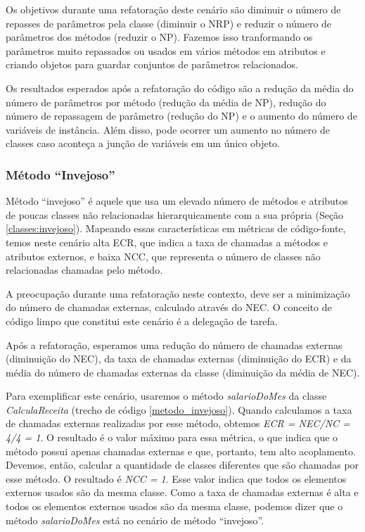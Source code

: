                                      
	
Os objetivos durante uma refatoração deste cenário são diminuir o número de repasses de parâmetros pela classe (diminuir o NRP) e reduzir o número de parâmetros dos métodos (reduzir o NP). Fazemos isso tranformando os parâmetros muito repassados ou usados em vários métodos em atributos e criando objetos para guardar conjuntos de parâmetros relacionados.
	
Os resultados esperados após a refatoração do código são a redução da média do número de parâmetros por método (redução da média de NP), redução do número de repassagem de parâmetro (redução do NP) e o aumento do número de variáveis de instância. Além disso, pode ocorrer um aumento no número de classes caso aconteça a junção de variáveis em um único objeto.	           


\subsubsection{Método ``Invejoso''}
	
Método ``invejoso'' é aquele que usa um elevado número de métodos e atributos de poucas classes não relacionadas hierarquicamente com a sua própria (Seção \ref{classes:invejoso}). Mapeando essas características em métricas de código-fonte, temos neste cenário alta ECR, que indica a taxa de chamadas a métodos e atributos externos, e baixa NCC, que representa o número de classes não relacionadas chamadas pelo método.
	
A preocupação durante uma refatoração neste contexto, deve ser a minimização do número de chamadas externas, calculado através do NEC. O conceito de código limpo que constitui este cenário é a delegação de tarefa.
	
Após a refatoração, esperamos uma redução do número de chamadas externas (diminuição do NEC), da taxa de chamadas externas (diminuição do ECR) e da média do número de chamadas externas da classe (diminuição da média de NEC).
                      
Para exemplificar este cenário, usaremos o método \textit{salarioDoMes} da classe \textit{CalculaReceita} (trecho de código \ref{metodo_invejoso}). Quando calculamos a taxa de chamadas externas realizadas por esse método, obtemos \textit{ECR = NEC/NC = 4/4 = 1}. O resultado é o valor máximo para essa métrica, o que indica que o método possui apenas chamadas externas e que, portanto, tem alto acoplamento. Devemos, então, calcular a quantidade de classes diferentes que são chamadas por esse método. O resultado é \textit{NCC = 1}. Esse valor indica que todos os elementos externos usados são da mesma classe. Como a taxa de chamadas externas é alta e todos os elementos externos usados são da mesma classe, podemos dizer que o método \textit{salarioDoMes} está no cenário de método ``invejoso''.

